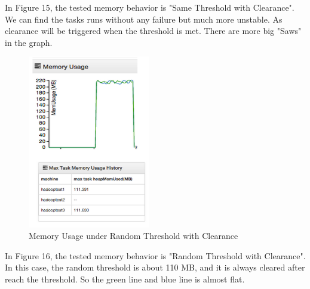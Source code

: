 In Figure 15, the tested memory behavior is "Same Threshold with Clearance". We can find the tasks runs without any failure but much more unstable. As clearance will be triggered when the threshold is met. There are more big "Saws" in the graph.

\begin{figure}[ht]
  \centering
    \includegraphics[width=2.1in]{image/test1d.png}
    \caption{Memory Usage under Random Threshold with Clearance}
    \label{ref:memory_allocation}
\end{figure}

In Figure 16, the tested memory behavior is "Random Threshold with Clearance". In this case, the random threshold is about 110 MB, and it is always cleared after reach the threshold. So the green line and blue line is almost flat.
